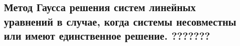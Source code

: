 {
\subsection{Метод Гаусса решения систем линейных уравнений в случае, когда системы несовместны или имеют единственное решение. ???????}
}